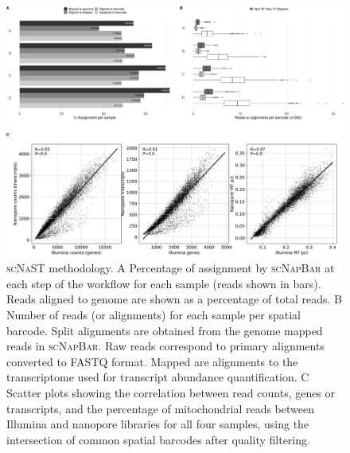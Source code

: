 \documentclass[utf8]{frontiers_suppmat} %
\newcommand{\scn}{\textsc{scNapBar}\xspace}
\newcommand{\scnast}{\textsc{scNaST}\xspace}
\begin{document}
\begin{figure}[htbp]
\begin{center}
\includegraphics[width=\textwidth]{figS1}%
\end{center}
\caption{\scnast methodology. A Percentage of assignment by \scn at each step of the workflow for each sample (reads shown in bars). Reads aligned to genome are shown as a percentage of total reads. B Number of reads (or alignments) for each sample per spatial barcode. Split alignments are obtained from the genome mapped reads in \scn. Raw reads correspond to primary alignments converted to FASTQ format. Mapped are alignments to the transcriptome used for transcript abundance quantification. C Scatter plots showing the correlation between read counts, genes or transcripts, and the percentage of mitochondrial reads between Illumina and nanopore libraries for all four samples, using the intersection of common spatial barcodes after quality filtering.}\label{fig:S1}
\end{figure}
\end{document}
